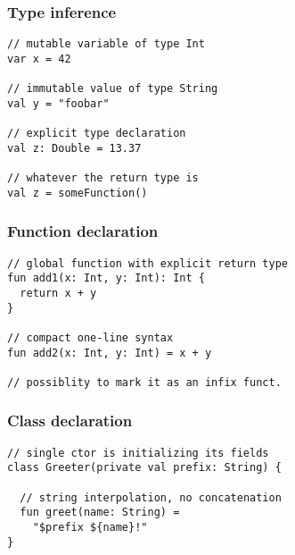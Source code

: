 

\begin{frame}[fragile] \frametitle{Type inference}
\begin{lstlisting}
// mutable variable of type Int
var x = 42

// immutable value of type String
val y = "foobar"

// explicit type declaration
val z: Double = 13.37

// whatever the return type is
val z = someFunction()
\end{lstlisting}
\end{frame}


\begin{frame}[fragile] \frametitle{Function declaration}
\begin{lstlisting}
// global function with explicit return type
fun add1(x: Int, y: Int): Int {
  return x + y
}

// compact one-line syntax
fun add2(x: Int, y: Int) = x + y

// possiblity to mark it as an infix funct.
\end{lstlisting}
\end{frame}


\begin{frame}[fragile] \frametitle{Class declaration}
\begin{lstlisting}
// single ctor is initializing its fields
class Greeter(private val prefix: String) {

  // string interpolation, no concatenation
  fun greet(name: String) =
    "$prefix ${name}!"
}
\end{lstlisting}
\end{frame}


